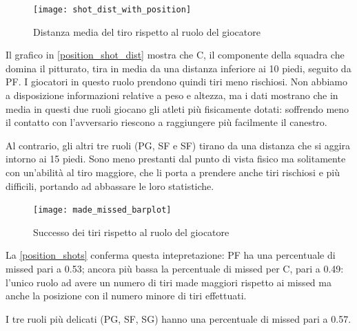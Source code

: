\par

\begin{figure}
\caption{Distanza media del tiro rispetto al ruolo del giocatore}
\label{position_shot_dist}
\texttt{[image: shot\_dist\_with\_position]}
\end{figure}

Il grafico in \autoref{position_shot_dist} mostra che C, il componente della squadra che domina il pitturato, tira in media da una distanza inferiore ai 10 piedi, seguito da PF. I giocatori in questo ruolo prendono quindi tiri meno rischiosi.
Non abbiamo a disposizione informazioni relative a peso e altezza, ma i dati  \cite{basketball-reference} mostrano che in media in questi due ruoli giocano gli atleti più fisicamente dotati: soffrendo meno il contatto con l'avversario riescono a raggiungere più facilmente il canestro.

Al contrario, gli altri tre ruoli (PG, SF e SF) tirano da una distanza che si aggira intorno ai 15 piedi. Sono meno prestanti dal punto di vista fisico ma solitamente con un'abilità al tiro maggiore, che li porta a prendere anche tiri rischiosi e più difficili, portando ad abbassare le loro statistiche.

\begin{figure}
\caption{Successo dei tiri rispetto al ruolo del giocatore}
\label{position_shots}
\texttt{[image: made\_missed\_barplot]}
\end{figure}

La \autoref{position_shots} conferma questa intepretazione: PF ha una percentuale di missed pari a 0.53; ancora più bassa la percentuale di missed per C, pari a 0.49: l'unico ruolo ad avere un numero di tiri made maggiori rispetto ai missed ma anche la posizione con il numero minore di tiri effettuati.

I tre ruoli più delicati (PG, SF, SG) hanno una percentuale di missed pari a 0.57.